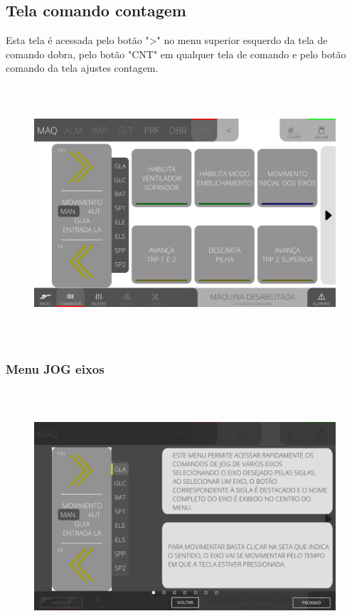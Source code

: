 \thispagestyle{fancy}
\vspace*{40 pt}
\subsection{Tela comando contagem}
 Esta tela é acessada pelo botão "\textgreater" no menu superior esquerdo da tela de comando dobra, pelo botão "CNT" em qualquer tela de comando e pelo botão comando da tela ajustes contagem.
 \vspace*{\fill}
 \begin{figure}[h]
  \centering
  \includegraphics[width=576px,height=360px]{src/imagesFlexo/08-count/commands/e-Tela-Principal.png}
\end{figure}
\vspace*{\fill}

\newpage
\thispagestyle{fancy}
\vspace*{40 pt}
\subsubsection{\small{Menu JOG eixos}}
\vspace*{\fill}
\begin{figure}[h]
  \centering
  \includegraphics[width=576px,height=360px]{src/imagesFlexo/08-count/commands/e-1.png}
\end{figure}
\vspace*{\fill}


